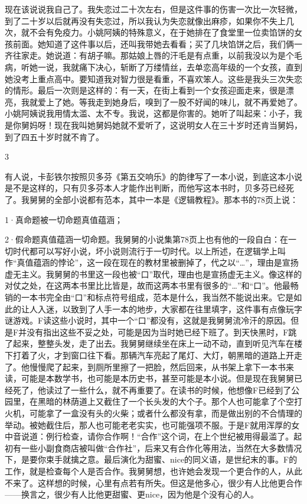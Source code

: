 现在该说说我自己了。我失恋过二十次左右，但是这件事的伤害一次比一次轻微，到了二十岁以后就再没有失恋过，所以我认为失恋就像出麻疹，如果你不失上几次，就不会有免疫力。小姚阿姨的特殊意义，在于她排在了食堂里一位卖馅饼的女孩前面。她知道了这件事以后，还叫我带她去看看；买了几块馅饼之后，我们俩一齐往家走。她说道：有胡子嘛。那姑娘上唇的汗毛是有点重，以前我没以为是个毛病，听她一说，我就痛下决心，斩断了万缕情丝，去单恋高年级的一个女孩，直到她没考上重点高中。要知道我对智力很是看重，不喜欢笨人。这些是我头三次失恋的情形。最后一次则是这样的：有一天，在街上看到一个女孩迎面走来，很是漂亮，我就爱上了她。等我走到她身后，嗅到了一股不好闻的味儿，就不再爱她了。小姚阿姨说我用情太滥、太不专。我说，这都是你害的。她听了叫起来：小子，我是你舅妈呀！现在我叫她舅妈她就不爱听了，这说明女人在三十岁时还肯当舅妈，到了四五十岁时就不肯了。 

3 

有人说，卡彭铁尔按照贝多芬《第五交响乐》的韵律写了一本小说，到底这本小说是不是这样的，只有贝多芬本人才能作出判断，而他写这本书时，贝多芬已经死了。我舅舅的全部小说都有范本，其中一本是《逻辑教程》。那本书的78页上说： 

1·真命题被一切命题真值蕴涵； 

2·假命题真值蕴涵一切命题。我舅舅的小说集第78页上也有他的一段自白：在一切时代都可以写好小说，坏小说则流行于一切时代。以上所述，在逻辑学上叫作“真值蕴涵的悖论”，这一段在现在的教材里被删掉了，代之以“…”，理由是宣扬虚无主义。我舅舅的书里这一段也被“口”取代，理由也是宣扬虚无主义。像这样的对仗之处，在这两本书里比比皆是，故而这两本书里有很多的“…”和“口”。他最畅销的一本书完全由“口”和标点符号组成，范本是什么，我当然不能说出来。它是如此的让人入迷，以致到了人手一本的地步，大家都在往里填字，这件事有点像玩字谜游戏。F读这些小说时，其中一个“口”都没有，这就是我舅舅流冷汗的原因。但是F并没有指出这些不妥之处，可能是因为当时她已经下班了。到天快黑时，F跳了起来，整整头发，走了出去。我舅舅继续坐在床上一动不动，直到听见汽车在楼下打着了火，才到窗口往下看。那辆汽车亮起了尾灯、大灯，朝黑暗的道路上开走了。他慢慢爬了起来，到厕所里擦了一把脸，然后回来，从书架上拿下一本书来读，可能是本数学书，也可能是本历史书，甚至可能是本小说。但是现在我舅舅已经死了，他读过了一些什么，就不再重要了。在读书的时候，他想像F已经到了公园里，在黑暗的林荫道上又截住了一个长头发的大个子。那个人也可能拿了个空打火机，可能拿了一盒没有头的火柴；或者什么都没有拿，而是做出别的不合情理的举动。被她截住后，那人也可能老老实实，也可能强项不服。于是F就用浑厚的女中音说道：例行检查，请你合作啊！“合作”这个词，在上个世纪被用得最滥了。起初有一些小副食商店被叫做“合作社”，后来又有合作化等用法，当然在大多数情况下，是要你束手就擒之意。最后演化为甜蜜、nice的同义语，是世纪末的事。F的工作，就是检查每个人是否合作。我舅舅想，也许她会发现一个更合作的人，从此不来了。这样想的时候，心里有点若有所失。但这是他多心，很少有人比他更合作——换言之，很少有人比他更甜蜜、更nice，因为他是个没有心的人。 

